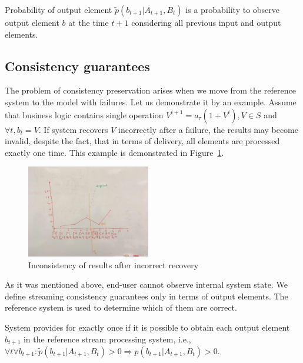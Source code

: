 \begin{definition}{Probability of output element}
$\widetilde{p}(b_{t+1}|A_{t+1}, B_t)$ is a probability to observe output element $b$ at the time $t+1$ considering all previous input and output elements.
\end{definition}

\subsection{Consistency guarantees}

The problem of consistency preservation arises when we move from the reference system to the model with failures. Let us demonstrate it by an example. Assume that business logic contains single operation $V^{i+1}=a_\tau(1+V^{i}),V\in{S}$ and $\forall{t},b_t=V$. If system recovers $V$ incorrectly after a failure, the results may become invalid, despite the fact, that in terms of delivery, all elements are processed exactly one time. This example is demonstrated in Figure~\ref{state-inconsistency}. 

\begin{figure}[htbp]
  \centering
  \includegraphics[width=0.48\textwidth]{pics/state-inconsistency}
  \caption{Inconsistency of results after incorrect recovery}
  \label {state-inconsistency}
\end{figure}

As it was mentioned above, end-user cannot observe internal system state. We define streaming consistency guarantees only in terms of output elements. The reference system is used to determine which of them are correct.

\begin{definition}{System provides for exactly once}
if it is possible to obtain each output element $b_{t+1}$ in the reference stream processing system, i.e.,\\ 
$\forall{t} \forall{b_{t+1}}: \widetilde{p}(b_{t+1}|A_{t+1},B_t)>0 \Rightarrow p(b_{t+1}|A_{t+1},B_t)>0$.
\end{definition}

